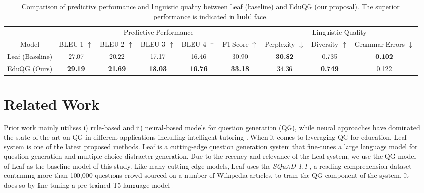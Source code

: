 \documentclass[letterpaper]{article} %
\begin{document}
\begin{table}[t!] \centering \small
\begin{tabular}{c|ccccc|ccc}
\hline
                & \multicolumn{5}{c}{Predictive Performance}                          & \multicolumn{3}{c}{Linguistic Quality}       \\
Model           & BLEU-1 $\uparrow$     & BLEU-2 $\uparrow$     & BLEU-3 $\uparrow$     & BLEU-4   $\uparrow$   & F1-Score  $\uparrow$        & Perplexity $\downarrow$       & Diversity $\uparrow$         & Grammar Errors $\downarrow$        \\

\hline
Leaf (Baseline) & 27.07          & 20.22          & 17.17          & {16.46} & 30.90          & \textbf{30.82} & 0.735          & \textbf{0.102} \\
EduQG (Ours)        & \textbf{29.19} & \textbf{21.69} & \textbf{18.03} & \textbf{16.76} & \textbf{33.18} & 34.36          & \textbf{0.749} & 0.122  \\
\hline
\end{tabular}
\caption{Comparison of predictive performance and linguistic quality between Leaf (baseline) and EduQG (our proposal). The superior performance is indicated in \textbf{bold} face.}
\label{results}
\end{table}
\section{Related Work}

Prior work mainly utilises i) rule-based and ii) neural-based models for question generation (QG), while neural approaches have dominated the state of the art on QG in different applications including intelligent tutoring \cite{zhang2021review}.
When it comes to leveraging QG for education, Leaf system \cite{vachev2022leaf} is one of the latest proposed methods.
Leaf is a cutting-edge question generation system that fine-tunes a large language model for question generation and multiple-choice distracter generation. Due to the recency and relevance of the Leaf system, we use the QG model of Leaf as the baseline model of this study.
Like many cutting-edge models, Leaf uses the \emph{SQuAD 1.1} \cite{DBLP:rajpurkar2016squad}, a reading comprehension dataset containing more than 100,000 questions crowd-sourced on a number of Wikipedia articles, to train the QG component of the system. It does so by fine-tuning a pre-trained T5 language model \cite{raffel2020exploring}.
\end{document}
